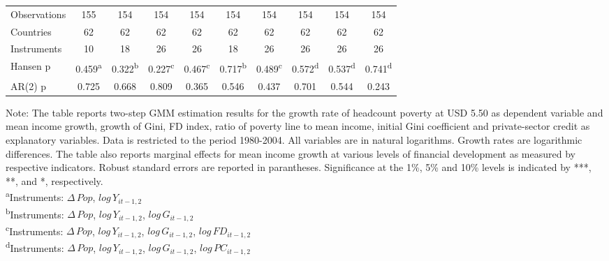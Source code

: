 \documentclass[12pt, a4paper]{article}
\begin{document}
\begin{table}
\begin{threeparttable}
{\begin{tabular}{l*{9}{c}}
				
				\hline
				Observations        &         155         &         154         &         154         &         154         &         154         &         154         &         154         &         154         &         154         \\
				Countries           &          62         &          62         &          62         &          62         &          62         &          62         &          62         &          62         &          62         \\
				Instruments         &          10         &          18         &          26         &          26         &          18         &          26         &          26         &          26         &          26         \\
				Hansen p         &       0.459\textsuperscript{a}         &       0.322\textsuperscript{b}         &       0.227\textsuperscript{c}         &       0.467\textsuperscript{c}         &       0.717\textsuperscript{b}         &       0.489\textsuperscript{c}         &       0.572\textsuperscript{d}         &       0.537\textsuperscript{d}         &       0.741\textsuperscript{d}         \\
				AR(2) p               &       0.725         &       0.668         &       0.809         &       0.365         &       0.546         &       0.437         &       0.701         &       0.544         &       0.243         \\
				\hline\hline
			\end{tabular}
		}
		\begin{tablenotes}
			\item \scriptsize{Note: The table reports two-step GMM estimation results for the growth rate of headcount poverty at USD 5.50 as dependent variable and mean income growth, growth of Gini, FD index, ratio of poverty line to mean income, initial Gini coefficient and private-sector credit as explanatory variables. Data is restricted to the period 1980-2004. All variables are in natural logarithms. Growth rates are logarithmic differences. The table also reports marginal effects for mean income growth at various levels of financial development as measured by respective indicators. Robust standard errors are reported in parantheses. Significance at the 1\%, 5\% and 10\% levels is indicated by ***, **, and *, respectively.\\
				\textsuperscript{a}Instruments: $\Delta \, Pop$, $log \, Y_{it-1,2}$}\\
			\textsuperscript{b}Instruments: $\Delta \, Pop$, $log \, Y_{it-1,2}$, $log \, G_{it-1,2}$\\
			\textsuperscript{c}Instruments: $\Delta \, Pop$, $log \, Y_{it-1,2}$, $log \, G_{it-1,2}$, $log \, FD_{it-1,2}$\\
			\textsuperscript{d}Instruments: $\Delta \, Pop$, $log \, Y_{it-1,2}$, $log \, G_{it-1,2}$, $log \, PC_{it-1,2}$\\
			

\end{tablenotes}
\end{threeparttable}
\end{table}
\end{document}
